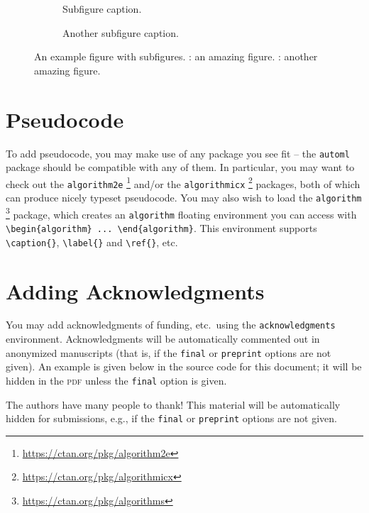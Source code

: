 \documentclass[11pt]{article}
\begin{document}
\begin{figure}
  \begin{subfigure}[t]{0.5\linewidth}
    \centering
    \caption{Subfigure caption.}
    \label{example_figure_left}
  \end{subfigure}
  \begin{subfigure}[t]{0.5\linewidth}
    \centering
    \caption{Another subfigure caption.}
    \label{example_figure_right}
  \end{subfigure}
  \caption{An example figure with subfigures. : an
    amazing figure. : another amazing figure.}
  \label{example_figure}
\end{figure}

\section{Pseudocode}
\label{sec:code}

To add pseudocode, you may make use of any package you see fit -- the
\texttt{automl} package should be compatible with any of them. In particular,
you may want to check out the \texttt{algorithm2e}%
%
\footnote{\url{https://ctan.org/pkg/algorithm2e}}
%
and/or the \texttt{algorithmicx}%
%
\footnote{\url{https://ctan.org/pkg/algorithmicx}}
%
packages, both of which can produce nicely typeset pseudocode. You may also wish
to load the \texttt{algorithm}%
%
\footnote{\url{https://ctan.org/pkg/algorithms}}
%
package, which creates an \texttt{algorithm} floating environment you can access
with \verb|\begin{algorithm} ... \end{algorithm}|. This environment supports
\verb|\caption{}|, \verb|\label{}| and \verb|\ref{}|, etc.

\section{Adding Acknowledgments}

You may add acknowledgments of funding, etc.\ using the \texttt{acknowledgments}
environment. Acknowledgments will be automatically commented out in anonymized
manuscripts (that is, if the \texttt{final} or \texttt{preprint} options are not
given). An example is given below in the source code for this document; it will
be hidden in the \textsc{pdf} unless the \texttt{final} option is given.

\begin{acknowledgements}
   The authors have many people to thank! This material will be automatically
   hidden for submissions, e.g., if the \texttt{final} or \texttt{preprint}
   options are not given.
 \end{acknowledgements}
\end{document}
